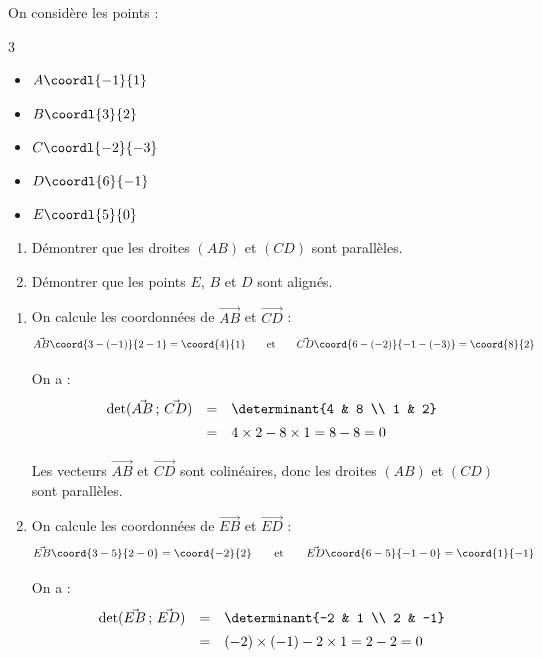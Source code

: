 \begin{methode}
	On considère les points :
	\begin{multicols}{3}
		\begin{itemize}
			\item $A\coordl{-1}{1}$
			\item $B\coordl{3}{2}$
			\item $C\coordl{-2}{-3}$
			\item $D\coordl{6}{-1}$
			\item $E\coordl{5}{0}$
		\end{itemize}
	\end{multicols}

	\begin{enumerate}
		\item Démontrer que les droites $(AB)$ et $(CD)$ sont parallèles.
		\item Démontrer que les points $E$, $B$ et $D$ sont alignés.
	\end{enumerate}

	\begin{correction}
		\nline
		\begin{enumerate}[itemsep=4mm]
			\item On calcule les coordonnées de $\vec{AB}$ et $\vec{CD}$ :
			      \[
				      \vec{AB}\coord{3-(-1)}{2-1} = \coord{4}{1}
				      \qquad\text{et}\qquad
				      \vec{CD}\coord{6-(-2)}{-1-(-3)} = \coord{8}{2}
			      \]

			      On a :
			      \[
				      \def\arraystretch{1.4}
				      \begin{array}{rcl}
					      \det(\vec{AB}\,;\,\vec{CD}) & = & \determinant{4                  & 8 \\ 1 & 2}\\
					                                  & = & 4\times2 - 8\times1 = 8 - 8 = 0
				      \end{array}
			      \]

			      Les vecteurs $\vec{AB}$ et $\vec{CD}$ sont colinéaires, donc les droites $(AB)$ et $(CD)$ sont parallèles.

			\item On calcule les coordonnées de $\vec{EB}$ et $\vec{ED}$ :
			      \[
				      \vec{EB}\coord{3-5}{2-0} = \coord{-2}{2}
				      \qquad\text{et}\qquad
				      \vec{ED}\coord{6-5}{-1-0} = \coord{1}{-1}
			      \]

			      On a :
			      \[
				      \def\arraystretch{1.4}
				      \begin{array}{rcl}
					      \det(\vec{EB}\,;\,\vec{ED}) & = & \determinant{-2                       & 1 \\ 2 & -1}\\
					                                  & = & (-2)\times(-1) - 2\times1 = 2 - 2 = 0
				      \end{array}
			      \]


\end{enumerate}
\end{correction}
\end{methode}
